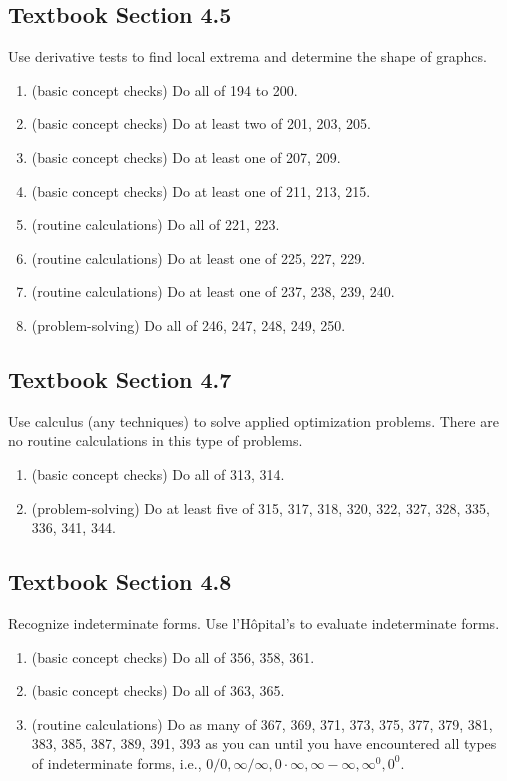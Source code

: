 \documentclass[../main.tex]{subfiles}
\begin{document}
\subsection*{Textbook Section 4.5}

Use derivative tests to find local extrema and determine the shape of graphcs.
\begin{enumerate}
  \item (basic concept checks) Do all of 194 to 200.
  \item (basic concept checks) Do at least two of 201, 203, 205.
  \item (basic concept checks) Do at least one of 207, 209.
  \item (basic concept checks) Do at least one of 211, 213, 215. 
  \item (routine calculations) Do all of 221, 223.
  \item (routine calculations) Do at least one of 225, 227, 229.
  \item (routine calculations) Do at least one of 237, 238, 239, 240.
  \item (problem-solving) Do all of 246, 247, 248, 249, 250.
\end{enumerate}

\clearpage
\subsection*{Textbook Section 4.7}

Use calculus (any techniques) to solve applied optimization problems.  There are no routine calculations in this type of problems.
\begin{enumerate}
  \item (basic concept checks) Do all of 313, 314.
  \item (problem-solving) Do at least five of 315, 317, 318, 320, 322, 327, 328, 335, 336, 341, 344.
\end{enumerate}

\subsection*{Textbook Section 4.8}

Recognize indeterminate forms. Use l'H\^opital's to evaluate indeterminate forms.
\begin{enumerate}
  \item (basic concept checks) Do all of 356, 358, 361.
  \item (basic concept checks) Do all of 363, 365.
  \item (routine calculations) Do as many of 367, 369, 371, 373, 375, 377, 379, 381, 383, 385, 387, 389, 391, 393 as you can until you have encountered all types of indeterminate forms, i.e., \(0/0, \infty/\infty, 0 \cdot \infty, \infty - \infty, \infty^{0}, 0^{0}\).
\end{enumerate}
\end{document}
